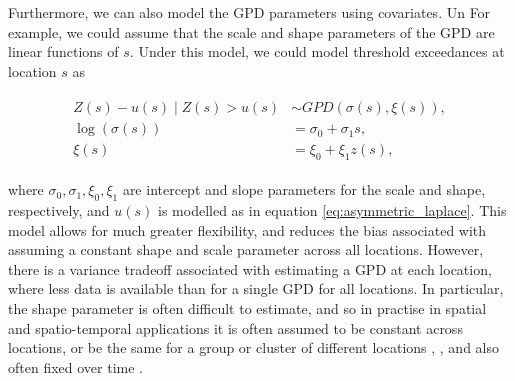 \documentclass{article}
\numberwithin{equation}{section}
\begin{document}
Furthermore, we can also model the GPD parameters using covariates.
Un
For example, we could assume that the scale and shape parameters of the GPD are linear functions of $s$.
Under this model, we could model threshold exceedances at location $s$ as 
\begin{center}
  \begin{align} \label{eq:non_stationary_gpd}
    \begin{split}
      Z(s) - u(s) \mid Z(s) > u(s) &\sim GPD(\sigma(s), \xi(s)), \\
                   \log(\sigma(s)) &= \sigma_0 + \sigma_1 s, \\
                            \xi(s) &= \xi_0 + \xi_1 z(s),
    \end{split}
  \end{align}
\end{center}
where $\sigma_0, \sigma_1, \xi_0, \xi_1$ are intercept and slope parameters for the scale and shape, respectively, and $u(s)$ is modelled as in equation \ref{eq:asymmetric_laplace}.
This model allows for much greater flexibility, and reduces the bias associated with assuming a constant shape and scale parameter across all locations.
However, there is a variance tradeoff associated with estimating a GPD at each location, where less data is available than for a single GPD for all locations.
In particular, the shape parameter is often difficult to estimate, and so in practise in spatial and spatio-temporal applications it is often assumed to be constant across locations, or be the same for a group or cluster of different locations \cite{Cooley2007}, \cite{Rohrbeck2021}, and also often fixed over time \cite{Risser2019} \cite{Zhang2024}. 
\end{document}

